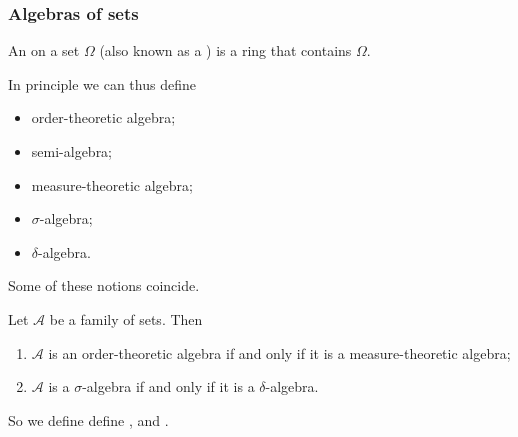 \subsubsection{Algebras of sets}
\begin{definition}
An  on a set $\Omega$ (also known as a ) is a ring that contains $\Omega$.
\end{definition}

In principle we can thus define
\begin{itemize}
\item order-theoretic algebra;
\item semi-algebra;
\item measure-theoretic algebra;
\item $\sigma$-algebra;
\item $\delta$-algebra.
\end{itemize}

Some of these notions coincide.

\begin{lemma} \label{setAlgebraCoincidence}
Let $\mathcal{A}$ be a family of sets. Then
\begin{enumerate}
\item $\mathcal{A}$ is an order-theoretic algebra \textup{if and only if} it is a measure-theoretic algebra;
\item $\mathcal{A}$ is a $\sigma$-algebra \textup{if and only if} it is a $\delta$-algebra.
\end{enumerate}
\end{lemma}

So we define define ,  and .

